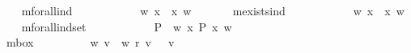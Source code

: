 \begin{isabellebody}
\ \ \isamarkupfalse%
\ mforall{\isacharunderscore}ind\ {\isacharcolon}{\isacharcolon}\ {\isachardoublequoteopen}{\isacharparenleft}{\isasymmu}\ {\isasymRightarrow}\ {\isasymsigma}{\isacharparenright}\ {\isasymRightarrow}\ {\isasymsigma}{\isachardoublequoteclose}\ {\isacharparenleft}{\isachardoublequoteopen}{\isasymforall}{\isachardoublequoteclose}{\isacharparenright}\ \ {\isachardoublequoteopen}{\isasymforall}\ {\isasymPhi}\ {\isasymequiv}\ {\isacharparenleft}{\isasymlambda}w{\isachardot}\ {\isasymforall}x{\isachardot}\ {\isasymPhi}\ x\ w{\isacharparenright}{\isachardoublequoteclose}\ \ \ \isanewline
\ \ \isamarkupfalse%
\ mexists{\isacharunderscore}ind\ {\isacharcolon}{\isacharcolon}\ {\isachardoublequoteopen}{\isacharparenleft}{\isasymmu}\ {\isasymRightarrow}\ {\isasymsigma}{\isacharparenright}\ {\isasymRightarrow}\ {\isasymsigma}{\isachardoublequoteclose}\ {\isacharparenleft}{\isachardoublequoteopen}{\isasymexists}{\isachardoublequoteclose}{\isacharparenright}\ \ {\isachardoublequoteopen}{\isasymexists}\ {\isasymPhi}\ {\isasymequiv}\ {\isacharparenleft}{\isasymlambda}w{\isachardot}\ {\isasymexists}x{\isachardot}\ {\isasymPhi}\ x\ w{\isacharparenright}{\isachardoublequoteclose}\isanewline
\ \ \isamarkupfalse%
\ mforall{\isacharunderscore}indset\ {\isacharcolon}{\isacharcolon}\ {\isachardoublequoteopen}{\isacharparenleft}{\isacharparenleft}{\isasymmu}\ {\isasymRightarrow}\ {\isasymsigma}{\isacharparenright}\ {\isasymRightarrow}\ {\isasymsigma}{\isacharparenright}\ {\isasymRightarrow}\ {\isasymsigma}{\isachardoublequoteclose}\ {\isacharparenleft}{\isachardoublequoteopen}{\isasymPi}{\isachardoublequoteclose}{\isacharparenright}\ \ {\isachardoublequoteopen}{\isasymPi}\ P\ {\isasymequiv}\ {\isacharparenleft}{\isasymlambda}w{\isachardot}\ {\isasymforall}x{\isachardot}\ P\ x\ w{\isacharparenright}{\isachardoublequoteclose}\isanewline
\ \ \isamarkupfalse%
\ mbox\ {\isacharcolon}{\isacharcolon}\ {\isachardoublequoteopen}{\isasymsigma}\ {\isasymRightarrow}\ {\isasymsigma}{\isachardoublequoteclose}\ {\isacharparenleft}{\isachardoublequoteopen}{\isasymbox}{\isachardoublequoteclose}{\isacharparenright}\ \ {\isachardoublequoteopen}{\isasymbox}\ {\isasymphi}\ {\isasymequiv}\ {\isacharparenleft}{\isasymlambda}w{\isachardot}\ {\isasymforall}v{\isachardot}\ {\isasymnot}\ w\ r\ v\ {\isasymor}\ {\isasymphi}\ v{\isacharparenright}{\isachardoublequoteclose}\isanewline
\ \ \isamarkupfalse%

\end{isabellebody}
